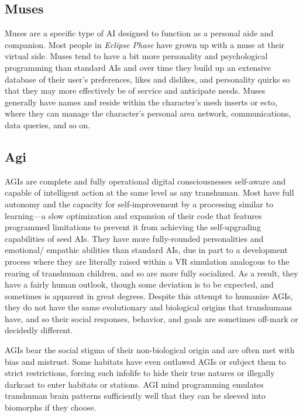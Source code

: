 \subsection{Muses}

Muses are a specific type of AI designed to function 
as a personal aide and companion. Most people in 
\textit{Eclipse Phase} have grown up with a muse at their 
virtual side. Muses tend to have a bit more personality 
and psychological programming than standard AIs and 
over time they build up an extensive database of their 
user's preferences, likes and dislikes, and personality 
quirks so that they may more effectively be of service 
and anticipate needs. Muses generally have names 
and reside within the character's mesh inserts or ecto, 
where they can manage the character's personal area 
network, communications, data queries, and so on.

\subsection{Agi}

AGIs are complete and fully operational digital consciousnesses
self-aware and capable of intelligent
action at the same level as any transhuman. Most have 
full autonomy and the capacity for self-improvement 
by a processing similar to learning—a slow optimization
and expansion of their code that features
programmed limitations to prevent it from achieving
the self-upgrading capabilities of seed AIs. They
have more fully-rounded personalities and emotional/
empathic abilities than standard AIs, due in part to 
a development process where they are literally raised 
within a VR simulation analogous to the rearing of 
transhuman children, and so are more fully socialized. 
As a result, they have a fairly human outlook, though 
some deviation is to be expected, and sometimes is 
apparent in great degrees. Despite this attempt to humanize
AGIs, they do not have the same evolutionary
and biological origins that transhumans have, and so 
their social responses, behavior, and goals are sometimes
off-mark or decidedly different.

AGIs bear the social stigma of their non-biological 
origin and are often met with bias and mistrust. Some 
habitats have even outlawed AGIs or subject them to 
strict restrictions, forcing such infolife to hide their 
true natures or illegally darkcast to enter habitats or 
stations. AGI mind programming emulates transhuman
brain patterns sufficiently well that they can be
sleeved into biomorphs if they choose.

